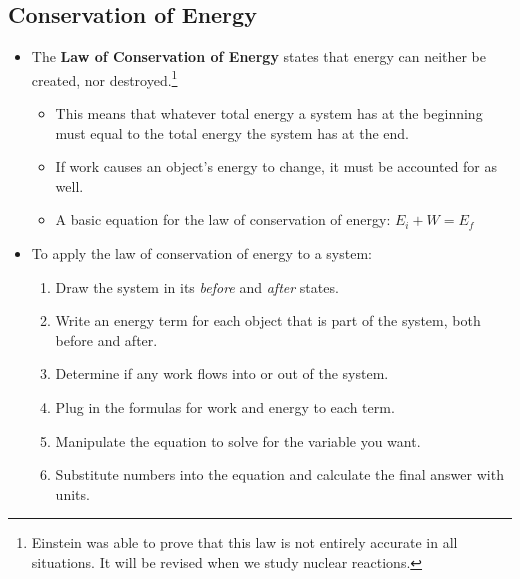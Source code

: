 \documentclass[letterpaper, 12pt]{article}
\begin{document}
\subsection*{Conservation of Energy}
\begin{itemize}
	\item The \textbf{Law of Conservation of Energy} states that energy can neither be created, nor destroyed.\footnote{Einstein was able to prove that this law is not entirely accurate in all situations.  It will be revised when we study nuclear reactions.} 
	\begin{itemize}
		\item This means that whatever total energy a system has at the beginning must equal to the total energy the system has at the end. 
		\item If work causes an object's energy to change, it must be accounted for as well.  
		\item A basic equation for the law of conservation of energy: $E_i + W = E_f $
	\end{itemize}
	\item To apply the law of conservation of energy to a system:
		\begin{enumerate}
			\item Draw the system in its \textit{before} and \textit{after} states.  
			\item Write an energy term for each object that is part of the system, both before and after.
			\item Determine if any work flows into or out of the system.
			\item Plug in the formulas for work and energy to each term.
			\item Manipulate the equation to solve for the variable you want.
			\item Substitute numbers into the equation and calculate the final answer with units. 
		\end{enumerate}
\end{itemize}



 
\end{document}
